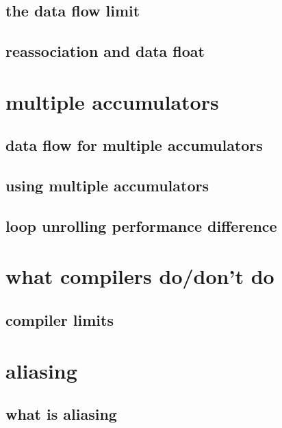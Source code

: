 \subsection{the data flow limit}


\subsection{reassociation and data float}


\section{multiple accumulators}

\subsection{data flow for multiple accumulators}


\subsection{using multiple accumulators}


\subsection{loop unrolling performance difference} %


\section{what compilers do/don't do}


\subsection{compiler limits}


\section{aliasing}

\subsection{what is aliasing}


